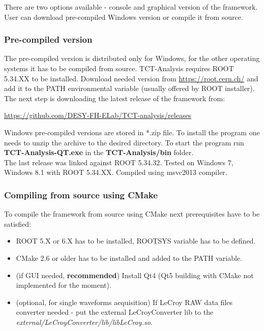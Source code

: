\documentclass[12pt,oneside,notitlepage,abstracton,a4paper]{scrartcl}
\begin{document}
There are two options available - console and graphical version of the framework. User can download pre-compiled Windows version or compile it from source.

\subsubsection{Pre-compiled version}

The pre-compiled version is distributed only for Windows, for the other operating systems it has to be compiled from source. TCT-Analysis requires ROOT 5.34.XX to be installed. Download needed version from \url{https://root.cern.ch/} and add it to the PATH environmental variable (usually offered by ROOT installer).
\\ \indent The next step is downloading the latest release of the framework from:
\begin{displayquote}
\url{https://github.com/DESY-FH-ELab/TCT-analysis/releases}
\end{displayquote}
Windows pre-compiled versions are stored in *.zip file. To install the program one needs to unzip the archive to the desired directory.
To start the program run \textbf{TCT-Analysis-QT.exe} in the \textbf{TCT-Analysis/bin} folder.
\\ \indent The last release was linked against ROOT 5.34.32. Tested on Windows 7, Windows 8.1 with ROOT 5.34.XX. Compiled using msvc2013 compiler.

\subsubsection{Compiling from source using CMake}

To compile the framework from source using CMake next prerequisites have to be satisfied:
\begin{itemize}
\item ROOT 5.X or 6.X has to be installed, ROOTSYS variable has to be defined.
\item CMake 2.6 or older has to be installed and added to the PATH variable.
\item (if GUI needed, \textbf{recommended}) Install Qt4 (Qt5 building with CMake not implemented for the moment).
\item (optional, for single waveforms acquisition) If LeCroy RAW data files converter needed - put the external LeCroyConverter lib to the \textit{external/LeCroyConverter/lib/libLeCroy.so}.
\end{itemize}
\end{document}
